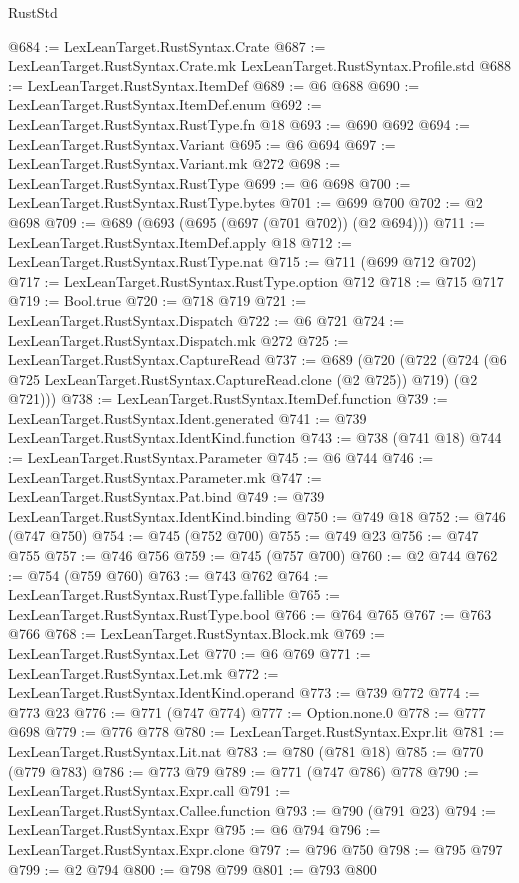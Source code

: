 \begin{lexlean}{RustStd}
\begin{coremodule}
@684 := LexLeanTarget.RustSyntax.Crate
@687 := LexLeanTarget.RustSyntax.Crate.mk LexLeanTarget.RustSyntax.Profile.std
@688 := LexLeanTarget.RustSyntax.ItemDef
@689 := @6 @688
@690 := LexLeanTarget.RustSyntax.ItemDef.enum
@692 := LexLeanTarget.RustSyntax.RustType.fn @18
@693 := @690 @692
@694 := LexLeanTarget.RustSyntax.Variant
@695 := @6 @694
@697 := LexLeanTarget.RustSyntax.Variant.mk @272
@698 := LexLeanTarget.RustSyntax.RustType
@699 := @6 @698
@700 := LexLeanTarget.RustSyntax.RustType.bytes
@701 := @699 @700
@702 := @2 @698
@709 := @689 (@693 (@695 (@697 (@701 @702)) (@2 @694)))
@711 := LexLeanTarget.RustSyntax.ItemDef.apply @18
@712 := LexLeanTarget.RustSyntax.RustType.nat
@715 := @711 (@699 @712 @702)
@717 := LexLeanTarget.RustSyntax.RustType.option @712
@718 := @715 @717
@719 := Bool.true
@720 := @718 @719
@721 := LexLeanTarget.RustSyntax.Dispatch
@722 := @6 @721
@724 := LexLeanTarget.RustSyntax.Dispatch.mk @272
@725 := LexLeanTarget.RustSyntax.CaptureRead
@737 := @689
    (@720
      (@722 (@724 (@6 @725 LexLeanTarget.RustSyntax.CaptureRead.clone (@2 @725)) @719) (@2 @721)))
@738 := LexLeanTarget.RustSyntax.ItemDef.function
@739 := LexLeanTarget.RustSyntax.Ident.generated
@741 := @739 LexLeanTarget.RustSyntax.IdentKind.function
@743 := @738 (@741 @18)
@744 := LexLeanTarget.RustSyntax.Parameter
@745 := @6 @744
@746 := LexLeanTarget.RustSyntax.Parameter.mk
@747 := LexLeanTarget.RustSyntax.Pat.bind
@749 := @739 LexLeanTarget.RustSyntax.IdentKind.binding
@750 := @749 @18
@752 := @746 (@747 @750)
@754 := @745 (@752 @700)
@755 := @749 @23
@756 := @747 @755
@757 := @746 @756
@759 := @745 (@757 @700)
@760 := @2 @744
@762 := @754 (@759 @760)
@763 := @743 @762
@764 := LexLeanTarget.RustSyntax.RustType.fallible
@765 := LexLeanTarget.RustSyntax.RustType.bool
@766 := @764 @765
@767 := @763 @766
@768 := LexLeanTarget.RustSyntax.Block.mk
@769 := LexLeanTarget.RustSyntax.Let
@770 := @6 @769
@771 := LexLeanTarget.RustSyntax.Let.mk
@772 := LexLeanTarget.RustSyntax.IdentKind.operand
@773 := @739 @772
@774 := @773 @23
@776 := @771 (@747 @774)
@777 := Option.none.{0}
@778 := @777 @698
@779 := @776 @778
@780 := LexLeanTarget.RustSyntax.Expr.lit
@781 := LexLeanTarget.RustSyntax.Lit.nat
@783 := @780 (@781 @18)
@785 := @770 (@779 @783)
@786 := @773 @79
@789 := @771 (@747 @786) @778
@790 := LexLeanTarget.RustSyntax.Expr.call
@791 := LexLeanTarget.RustSyntax.Callee.function
@793 := @790 (@791 @23)
@794 := LexLeanTarget.RustSyntax.Expr
@795 := @6 @794
@796 := LexLeanTarget.RustSyntax.Expr.clone
@797 := @796 @750
@798 := @795 @797
@799 := @2 @794
@800 := @798 @799
@801 := @793 @800

\end{coremodule}
\end{lexlean}
